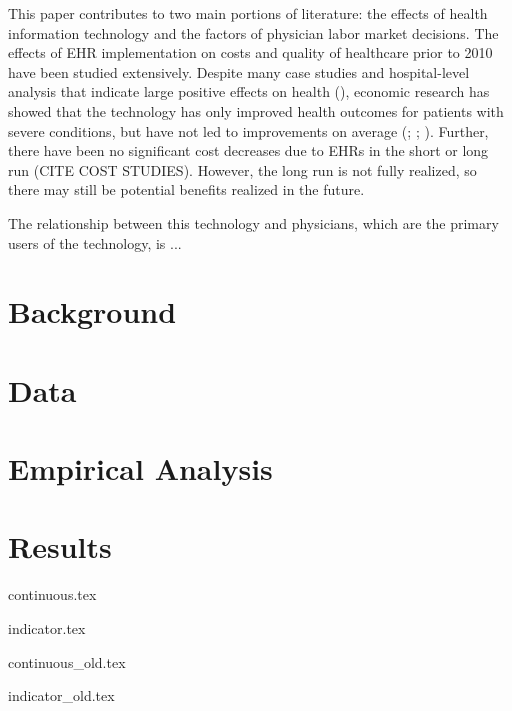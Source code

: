 \documentclass[11pt]{article}
\begin{document}
This paper contributes to two main portions of literature: the effects of health information technology and the factors of physician labor market decisions. The effects of EHR implementation on costs and quality of healthcare prior to 2010 have been studied extensively. Despite many case studies and hospital-level analysis that indicate large positive effects on health (\cite{Buntin2011TheResults}), economic research has showed that the technology has only improved health outcomes for patients with severe conditions, but have not led to improvements on average (\cite{Agha2014TheCare}; \cite{McCullough2016HealthCoordination}; \cite{Meyerhoefer}). Further, there have been no significant cost decreases due to EHRs in the short or long run (CITE COST STUDIES). However, the long run is not fully realized, so there may still be potential benefits realized in the future. 

The relationship between this technology and physicians, which are the primary users of the technology, is ...


\section{Background}

\section{Data}

\section{Empirical Analysis}

\section{Results}


\newpage

{continuous.tex}

\newpage

{indicator.tex}

\newpage

{continuous_old.tex}

\newpage

{indicator_old.tex}

\newpage
\end{document}
